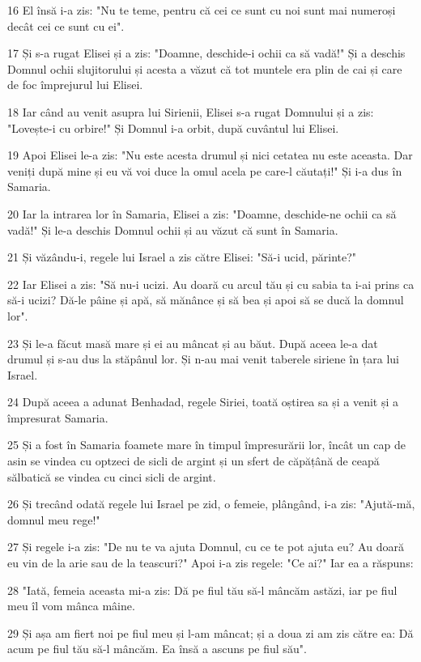 \par 16 El însă i-a zis: "Nu te teme, pentru că cei ce sunt cu noi sunt mai numeroși decât cei ce sunt cu ei".
\par 17 Și s-a rugat Elisei și a zis: "Doamne, deschide-i ochii ca să vadă!" Și a deschis Domnul ochii slujitorului și acesta a văzut că tot muntele era plin de cai și care de foc împrejurul lui Elisei.
\par 18 Iar când au venit asupra lui Sirienii, Elisei s-a rugat Domnului și a zis: "Lovește-i cu orbire!" Și Domnul i-a orbit, după cuvântul lui Elisei.
\par 19 Apoi Elisei le-a zis: "Nu este acesta drumul și nici cetatea nu este aceasta. Dar veniți după mine și eu vă voi duce la omul acela pe care-l căutați!" Și i-a dus în Samaria.
\par 20 Iar la intrarea lor în Samaria, Elisei a zis: "Doamne, deschide-ne ochii ca să vadă!" Și le-a deschis Domnul ochii și au văzut că sunt în Samaria.
\par 21 Și văzându-i, regele lui Israel a zis către Elisei: "Să-i ucid, părinte?"
\par 22 Iar Elisei a zis: "Să nu-i ucizi. Au doară cu arcul tău și cu sabia ta i-ai prins ca să-i ucizi? Dă-le pâine și apă, să mănânce și să bea și apoi să se ducă la domnul lor".
\par 23 Și le-a făcut masă mare și ei au mâncat și au băut. După aceea le-a dat drumul și s-au dus la stăpânul lor. Și n-au mai venit taberele siriene în țara lui Israel.
\par 24 După aceea a adunat Benhadad, regele Siriei, toată oștirea sa și a venit și a împresurat Samaria.
\par 25 Și a fost în Samaria foamete mare în timpul împresurării lor, încât un cap de asin se vindea cu optzeci de sicli de argint și un sfert de căpățână de ceapă sălbatică se vindea cu cinci sicli de argint.
\par 26 Și trecând odată regele lui Israel pe zid, o femeie, plângând, i-a zis: "Ajută-mă, domnul meu rege!"
\par 27 Și regele i-a zis: "De nu te va ajuta Domnul, cu ce te pot ajuta eu? Au doară eu vin de la arie sau de la teascuri?" Apoi i-a zis regele: "Ce ai?" Iar ea a răspuns:
\par 28 "Iată, femeia aceasta mi-a zis: Dă pe fiul tău să-l mâncăm astăzi, iar pe fiul meu îl vom mânca mâine.
\par 29 Și așa am fiert noi pe fiul meu și l-am mâncat; și a doua zi am zis către ea: Dă acum pe fiul tău să-l mâncăm. Ea însă a ascuns pe fiul său".

